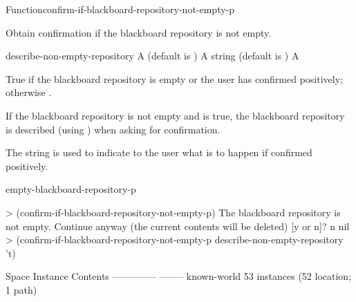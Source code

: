 \documentclass[10pt,twoside,english,pdftex]{article}
\begin{document}
\begin{functiondoc}{Function}{confirm-if-blackboard-repository-not-empty-p}{%
      
    \returns{} }
%

\fnsyntax 

\fnpurpose Obtain confirmation if the blackboard repository is not empty.

\fnpackage {}

\fnmodule {}

\fnargs
\begin{args}{describe-non-empty-repository}
 A  (default is \nil)
 A string (default is )
\arg[boolean] A 
\end{args}

\fnreturns True if the blackboard repository is empty or the user has
confirmed positively; otherwise \nil.

\fndescription
%
If the blackboard repository is not empty and
 is true, the blackboard
repository is described (using
) when asking for
confirmation.

The  string is used to indicate to the user what
is to happen if confirmed positively.

\begin{alsos}{empty-blackboard-repository-p}
\end{alsos}

\fnexamples 
%
\W\supp
\begin{example}
  > (confirm-if-blackboard-repository-not-empty-p)
  The blackboard repository is not empty.
  Continue anyway (the current contents will be deleted) [y or n]? n
  nil
  > (confirm-if-blackboard-repository-not-empty-p 
       describe-non-empty-repository 't)

  Space Instance                        Contents
  --------------                        --------
  known-world                           53 instances (52 location; 1 path)


\end{example}
\end{functiondoc}
\end{document}
